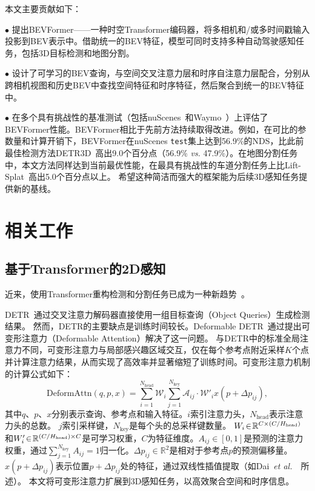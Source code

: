 \documentclass{article}
\newcommand{\etal}{\textit{et al.}}
\def\etal{{\em et al.~}}
\begin{document}
本文主要贡献如下：

$\bullet$ 提出BEVFormer——一种时空Transformer编码器，将多相机和/或多时间戳输入投影到BEV表示中。借助统一的BEV特征，模型可同时支持多种自动驾驶感知任务，包括3D目标检测和地图分割。

$\bullet$ 设计了可学习的BEV查询，与空间交叉注意力层和时序自注意力层配合，分别从跨相机视图和历史BEV中查找空间特征和时序特征，然后聚合到统一的BEV特征中。

$\bullet$ 在多个具有挑战性的基准测试（包括nuScenes~\cite{caesar2020nuscenes}和Waymo~\cite{sun2020scalability}）上评估了BEVFormer性能。BEVFormer相比于先前方法持续取得改进。例如，在可比的参数量和计算开销下，BEVFormer在nuScenes \texttt{test}集上达到56.9\%的NDS，比此前最佳检测方法DETR3D~\cite{wang2022detr3d}高出9.0个百分点（56.9\% \emph{vs.} 47.9\%）。在地图分割任务中，本文方法同样达到当前最优性能，在最具有挑战性的车道分割任务上比Lift-Splat~\cite{philion2020lift}高出5.0个百分点以上。
希望这种简洁而强大的框架能为后续3D感知任务提供新的基线。

\section{相关工作}

\subsection{基于Transformer的2D感知}
近来，使用Transformer重构检测和分割任务已成为一种新趋势~\cite{carion2020end,zhu2020deformable,li2021panoptic}。

DETR~\cite{carion2020end}通过交叉注意力解码器直接使用一组目标查询（Object Queries）生成检测结果。
然而，DETR的主要缺点是训练时间较长。Deformable DETR~\cite{zhu2020deformable}通过提出可变形注意力（Deformable Attention）解决了这一问题。
%
与DETR中的标准全局注意力不同，可变形注意力与局部感兴趣区域交互，仅在每个参考点附近采样$K$个点并计算注意力结果，从而实现了高效率并显著缩短了训练时间。可变形注意力机制的计算公式如下：
\begin{equation}
\text{DeformAttn}(q, p, x) = \sum_{i=1}^{N_\text{head}} \mathcal{W}_i\sum_{j=1}^{N_\text{key}} \mathcal{A}_{ij} \cdot \mathcal{W}'_i x(p+ \Delta p_{ij}),
\label{eq:single_deform_attn_fun}
\end{equation}
其中$q$、$p$、$x$分别表示查询、参考点和输入特征。$i$索引注意力头，$N_\text{head}$表示注意力头的总数。
%
$j$索引采样键，$N_\text{key}$是每个头的总采样键数量。
%
$W_i\!\in\!\mathbb{R}^{C\times (C / H_{\rm head})}$和$W'_i\!\in\!\mathbb{R}^{(C / H_{\rm head})\times C}$是可学习权重，$C$为特征维度。$A_{ij}\!\in\![0,1]$是预测的注意力权重，通过$\sum_{j=1}^{N_\text{key}} A_{ij}\!= \!1$归一化。$\Delta p_{ij}\!\in\!\mathbb{R}^2$是相对于参考点$p$的预测偏移量。$x(p + \Delta p_{ij})$表示位置$p + \Delta p_{ij}$处的特征，通过双线性插值提取（如Dai~\etal~\cite{dai2017deformable}所述）。
本文将可变形注意力扩展到3D感知任务，以高效聚合空间和时序信息。
\end{document}
